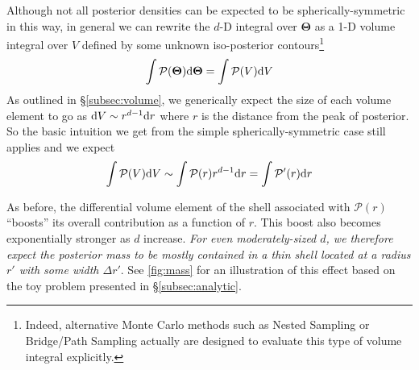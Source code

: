 \documentclass[12pt, titlepage]{article}
\newcommand{\deriv}{\ensuremath{{\rm d}}}  %
\newcommand{\params}{\ensuremath{\boldsymbol\Theta}}
\newcommand{\posterior}{\ensuremath{\mathcal{P}}}
\begin{document}
Although not all posterior densities can be expected to
be spherically-symmetric in this way, in general we can
rewrite the $d$-D integral over $\params$ as a 1-D volume integral
over $V$ defined by some unknown iso-posterior 
contours\footnote{Indeed, alternative Monte Carlo methods such as 
Nested Sampling \citep{skilling04,skilling06} or 
Bridge/Path Sampling \citep{gelmanmeng98} actually are designed to 
evaluate this type of volume integral explicitly.}
\begin{equation}
    \int \posterior(\params) \deriv \params
    = \int \posterior(V) \deriv V
\end{equation}
As outlined in \S\ref{subsec:volume}, we generically
expect the size of each volume element to go as
$\deriv V \sim r^{d-1} \deriv r$ where $r$ is the
distance from the peak of posterior. So the basic
intuition we get from the simple spherically-symmetric case
still applies and we expect
\begin{equation}
    \int \posterior(V) \deriv V 
    \sim \int \posterior(r) r^{d-1} \deriv r
    = \int \posterior'(r) \deriv r
\end{equation}

As before, the differential volume element of the
shell associated with $\posterior(r)$ ``boosts'' its overall
contribution as a function of $r$. This boost also becomes
exponentially stronger as $d$ increase. 
\textit{For even moderately-sized $d$,
we therefore expect the posterior mass
to be mostly contained in a thin shell located at a radius $r'$
with some width $\Delta r'$}.
See {\color{red} \autoref{fig:mass}} for an illustration of this effect
based on the toy problem presented in \S\ref{subsec:analytic}.
\end{document}
